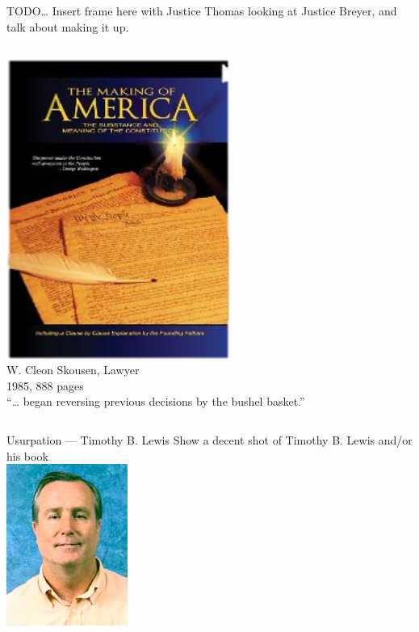 \begin{frame}{TODO\ldots}
    Insert frame here with Justice Thomas looking at Justice Breyer, and talk about making it up.
\end{frame}

\begin{frame}
    \begin{columns}[onlytextwidth]
            \centering
            \includegraphics[width=0.75\textwidth]{img/making-of-america.png} \\
            W. Cleon Skousen, Lawyer \\
            1985, 888 pages \\

            ``\ldots {} began reversing previous decisions by the bushel basket.''
    \end{columns}
\end{frame}

\begin{frame}{Usurpation --- Timothy B. Lewis}
    Show a decent shot of Timothy B. Lewis and/or his book \\
    \includegraphics{img/timothy-lewis.png}
\end{frame}

